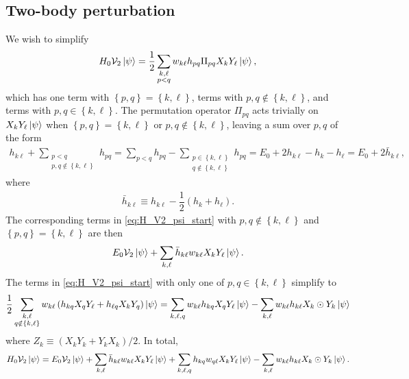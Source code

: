 \documentclass[nofootinbib,notitlepage,11pt]{revtex4-2}
\newcommand{\f}[2]{\dfrac{#1}{#2}} %
\newcommand{\p}[1]{\left(#1\right)} %
\renewcommand{\set}[1]{\left\{#1\right\}} %
\newcommand{\1}{\mathds{1}}
\newcommand{\V}{\mathcal{V}}
\begin{document}
\subsection{Two-body perturbation}
\label{sec:H_V2_psi}

We wish to simplify
\begin{align}
  H_0 \V_2 \ket\psi
  = \f12 \sum_{\substack{k,\ell\\p<q}} w_{k\ell} h_{pq}
  \Pi_{pq} X_k Y_\ell \ket\psi,
  \label{eq:H_V2_psi_start}
\end{align}
which has one term with $\set{p,q}=\set{k,\ell}$, terms with
$p,q\notin\set{k,\ell}$, and terms with $p,q\in\set{k,\ell}$.  The
permutation operator $\Pi_{pq}$ acts trivially on
$X_k Y_\ell \ket\psi$ when $\set{p,q}=\set{k,\ell}$ or
$p,q\notin\set{k,\ell}$, leaving a sum over $p,q$ of the form
\begin{align}
  h_{k\ell} + \sum_{\substack{p<q\\p,q\notin\set{k,\ell}}} h_{pq}
  = \sum_{p<q} h_{pq}
  - \sum_{\substack{p\in\set{k,\ell}\\q\notin\set{k,\ell}}} h_{pq}
  = E_0 + 2 h_{k\ell} - h_k - h_\ell
  = E_0 + 2 \bar h_{k\ell},
\end{align}
where
\begin{align}
  \bar h_{k\ell} \equiv h_{k\ell} - \f12\p{h_k + h_\ell}.
\end{align}
The corresponding terms in \eqref{eq:H_V2_psi_start} with
$p,q\notin\set{k,\ell}$ and $\set{p,q}=\set{k,\ell}$ are then
\begin{align}
  E_0 \V_2 \ket\psi
  + \sum_{k,\ell} \bar h_{k\ell} w_{k\ell} X_k Y_\ell \ket\psi.
\end{align}
The terms in \eqref{eq:H_V2_psi_start} with only one of
$p,q\in\set{k,\ell}$ simplify to
\begin{align}
  \f12 \sum_{\substack{k,\ell\\q\notin\set{k,\ell}}} w_{k\ell}
  \p{h_{kq} X_q Y_\ell + h_{\ell q} X_k Y_q} \ket\psi
  = \sum_{k,\ell,q} w_{k\ell} h_{kq} X_q Y_\ell \ket\psi
  - \sum_{k,\ell} w_{k\ell} h_{k\ell} X_k\odot Y_k \ket\psi
\end{align}
where $Z_k\equiv\p{X_kY_k+Y_kX_k}/2$.  In total,
\begin{align}
  H_0 \V_2 \ket\psi
  = E_0 \V_2 \ket\psi
  + \sum_{k,\ell} \bar h_{k\ell} w_{k\ell} X_k Y_\ell \ket\psi
  + \sum_{k,\ell,q} h_{kq} w_{q\ell} X_k Y_\ell \ket\psi
  - \sum_{k,\ell} w_{k\ell} h_{k\ell} X_k\odot Y_k \ket\psi.
\end{align}
\end{document}
